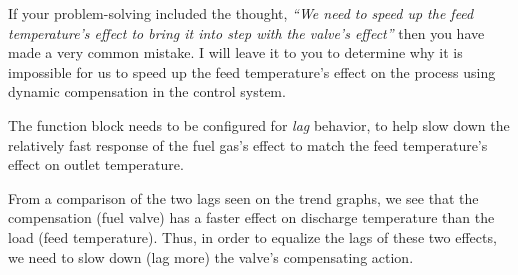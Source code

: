 





If your problem-solving included the thought, {\it ``We need to speed up the feed temperature's effect to bring it into step with the valve's effect''} then you have made a very common mistake.  I will leave it to you to determine why it is impossible for us to speed up the feed temperature's effect on the process using dynamic compensation in the control system.







The function block needs to be configured for {\it lag} behavior, to help slow down the relatively fast response of the fuel gas's effect to match the feed temperature's effect on outlet temperature.

\vskip 10pt

From a comparison of the two lags seen on the trend graphs, we see that the compensation (fuel valve) has a faster effect on discharge temperature than the load (feed temperature).  Thus, in order to equalize the lags of these two effects, we need to slow down (lag more) the valve's compensating action.




